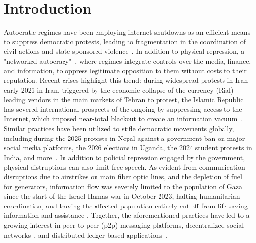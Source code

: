 \chapter{Introduction}
\label{chap:intro}

Autocratic regimes have been employing internet shutdowns as an efficient means to suppress democratic protests, leading to fragmentation in the coordination of civil actions and state-sponsored violence~\cite{Sarvestany2026,digital-repression-palestine,internet-shutdown-human-rights}. In addition to physical repression, a "networked autocracy"~\cite{Lopez2026}, where regimes integrate controls over the media, finance, and information, to oppress legitimate opposition to them without costs to their reputation. 
Recent crises highlight this trend: during widespread protests in Iran early 2026 in Iran, triggered by the economic collapse of the currency (Rial) leading vendors in the main markets of Tehran to protest, the Islamic Republic has severed international prospects of the ongoing by suppressing access to the Internet, which imposed near-total blackout to create an information vacuum~\cite{Sarvestany2026}. Similar practices have been utilized to stifle democratic movements globally, including during the 2025 protests in Nepal against a government ban on major social media platforms, the 2026 elections in Uganda, the 2024 student protests in India, and more~\cite{Lopez2026,Aceto2026,Suwal2025}.
In addition to policial repression engaged by the government, physical distruptions can also limit free speech.
As evident from communication disruptions due to airstrikes on main fiber optic lines, and the depletion of fuel for generators, information flow was severely limited to the population of Gaza since the start of the Israel-Hamas war in October 2023, halting humanitarian coordination, and leaving the affected population entirely cut off from life-saving information and assistance \cite{gaza-brief,gaza-report}.
Together, the aforementioned practices have led to a growing interest in peer-to-peer (p2p) messaging platforms, decentralized social networks~\cite{Balduf2024,Aravindh2019}, and distributed ledger-based applications~\cite{bitcoin,ethereum}.

